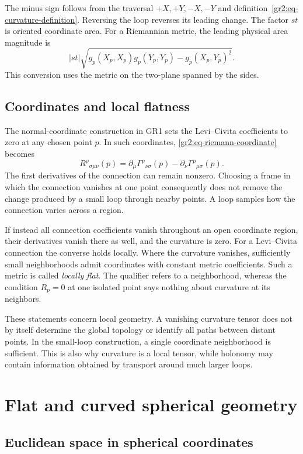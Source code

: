 \documentclass[11pt,a4paper]{article}
\numberwithin{equation}{section}
\newcommand{\slidesref}[1]{\par\nobreak\smallskip\nobreak{\footnotesize\color{ink!60}\textsc{Source slides #1}}\par\nobreak\smallskip\nobreak}
\begin{document}
The minus sign follows from the traversal \(+X,+Y,-X,-Y\) and
definition~\eqref{gr2:eq-curvature-definition}. Reversing the loop
reverses its leading change. The factor \(st\) is oriented coordinate
area. For a Riemannian metric, the leading physical area magnitude is
\[
 |st|\sqrt{g_p(X_p,X_p)g_p(Y_p,Y_p)-g_p(X_p,Y_p)^2}.
\]
This conversion uses the metric on the two-plane spanned by the sides.

\subsection{Coordinates and local flatness}

The normal-coordinate construction in GR1 sets the Levi--Civita
coefficients to zero at any chosen point \(p\). In such coordinates,
\eqref{gr2:eq-riemann-coordinate} becomes
\[
 R^\rho{}_{\sigma\mu\nu}(p)
 =\partial_\mu\Gamma^\rho{}_{\nu\sigma}(p)
  -\partial_\nu\Gamma^\rho{}_{\mu\sigma}(p).
\]
The first derivatives of the connection can remain nonzero. Choosing a
frame in which the connection vanishes at one point consequently does
not remove the change produced by a small loop through nearby points.
A loop samples how the connection varies across a region.

If instead all connection coefficients vanish throughout an open
coordinate region, their derivatives vanish there as well, and the
curvature is zero. For a Levi--Civita connection the converse holds
locally. Where the curvature vanishes, sufficiently small neighborhoods
admit coordinates with constant metric coefficients. Such a metric is
called \emph{locally flat}. The qualifier refers to a neighborhood,
whereas the condition \(R_p=0\) at one isolated point says nothing about
curvature at its neighbors.

These statements concern local geometry. A vanishing curvature tensor
does not by itself determine the global topology or identify all paths
between distant points. In the small-loop construction, a single
coordinate neighborhood is sufficient. This is also why curvature is a
local tensor, while holonomy may contain information obtained by
transport around much larger loops.

\section{Flat and curved spherical geometry}
\label{gr2:sec-spherical-curvature}
\slidesref{10--11}

\subsection{Euclidean space in spherical coordinates}
\end{document}
